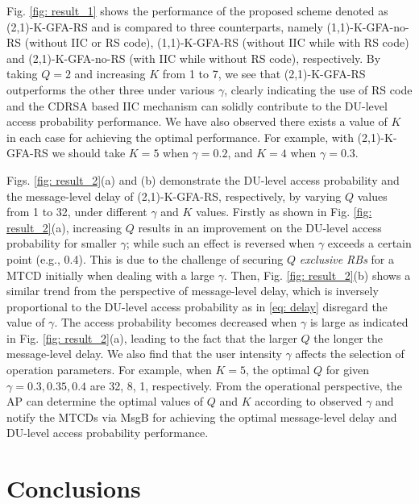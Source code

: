 \documentclass[a4paper]{IEEEtran}
\begin{document}
Fig. \ref{fig: result_1} shows the performance of the proposed scheme denoted as (2,1)-K-GFA-RS and is compared to three counterparts, namely (1,1)-K-GFA-no-RS (without IIC or RS code), (1,1)-K-GFA-RS (without IIC while with RS code) and (2,1)-K-GFA-no-RS (with IIC while without RS code), respectively. By taking $Q=2$ and increasing $K$ from 1 to 7, we see that (2,1)-K-GFA-RS outperforms the other three under various $\gamma$, clearly indicating the use of RS code and the CDRSA based IIC mechanism can solidly contribute to the DU-level access probability performance. We have also observed there exists a value of $K$ in each case for achieving the optimal performance. For example, with (2,1)-K-GFA-RS we should take $K=5$ when $\gamma=0.2$, and $K=4$ when $\gamma=0.3$. 


Figs. \ref{fig: result_2}(a) and (b) demonstrate the DU-level access probability and the message-level delay of (2,1)-K-GFA-RS, respectively, by varying $Q$ values from 1 to 32, under different $\gamma$ and $K$ values. Firstly as shown in Fig. \ref{fig: result_2}(a), increasing $Q$ results in an improvement on the DU-level access probability for smaller $\gamma$; while such an effect is reversed when $\gamma$ exceeds a certain point (e.g., 0.4). This is due to the challenge of securing $Q$ \textit{exclusive RBs} for a MTCD initially when dealing with a large $\gamma$. Then, Fig. \ref{fig: result_2}(b) shows a similar trend from the perspective of message-level delay, which is inversely proportional to the DU-level access probability as in \eqref{eq: delay} disregard the value of $\gamma$. The access probability becomes decreased when $\gamma$ is large as indicated in Fig. \ref{fig: result_2}(a), leading to the fact that the larger $Q$ the longer the message-level delay. We also find that the user intensity $\gamma$ affects the selection of operation parameters. For example, when $K = 5$, the optimal $Q$ for given $\gamma = 0.3, 0.35, 0.4$ are 32, 8, 1, respectively. From the operational perspective, the AP can determine the optimal values of $Q$ and $K$ according to observed $\gamma$ and notify the MTCDs via MsgB for achieving the optimal message-level delay and DU-level access probability performance.

\section{Conclusions}
\end{document}
